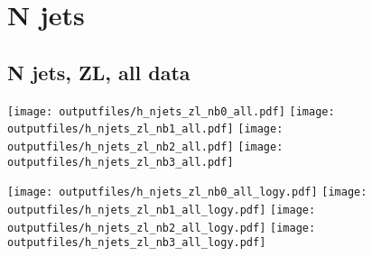 \documentclass[11pt]{article}
\begin{document}















  \clearpage
   \section{ N jets }

    \subsection{ N jets, ZL, all data}

    \noindent
     \texttt{[image: outputfiles/h\_njets\_zl\_nb0\_all.pdf]}
     \texttt{[image: outputfiles/h\_njets\_zl\_nb1\_all.pdf]}
     \texttt{[image: outputfiles/h\_njets\_zl\_nb2\_all.pdf]}
     \texttt{[image: outputfiles/h\_njets\_zl\_nb3\_all.pdf]}

    \noindent
     \texttt{[image: outputfiles/h\_njets\_zl\_nb0\_all\_logy.pdf]}
     \texttt{[image: outputfiles/h\_njets\_zl\_nb1\_all\_logy.pdf]}
     \texttt{[image: outputfiles/h\_njets\_zl\_nb2\_all\_logy.pdf]}
     \texttt{[image: outputfiles/h\_njets\_zl\_nb3\_all\_logy.pdf]}
\end{document}
